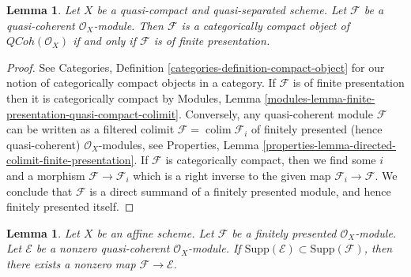 \documentclass{stacks-project}
\theoremstyle{plain}
\newtheorem{lemma}[subsection]{Lemma}
\theoremstyle{definition}
\theoremstyle{remark}
\numberwithin{equation}{subsection}
\def\colim{\mathop{\mathrm{colim}}\nolimits}
\def\QCoh{\mathit{QCoh}}
\begin{document}
\begin{lemma}
\label{lemma-categorically-compact-QCoh}
Let $X$ be a quasi-compact and quasi-separated scheme.
Let $\mathcal{F}$ be a quasi-coherent $\mathcal{O}_X$-module.
Then $\mathcal{F}$ is a categorically compact object of
$\QCoh(\mathcal{O}_X)$ if and only if $\mathcal{F}$ is of
finite presentation.
\end{lemma}

\begin{proof}
See Categories, Definition \ref{categories-definition-compact-object}
for our notion of categorically compact objects in a category.
If $\mathcal{F}$ is of finite presentation then it is categorically compact by
Modules, Lemma \ref{modules-lemma-finite-presentation-quasi-compact-colimit}.
Conversely, any quasi-coherent module $\mathcal{F}$ can be written
as a filtered colimit $\mathcal{F} = \colim \mathcal{F}_i$ of
finitely presented (hence quasi-coherent)
$\mathcal{O}_X$-modules, see Properties, Lemma
\ref{properties-lemma-directed-colimit-finite-presentation}.
If $\mathcal{F}$ is categorically compact, then we find
some $i$ and a morphism $\mathcal{F} \to \mathcal{F}_i$
which is a right inverse to the given map $\mathcal{F}_i \to \mathcal{F}$.
We conclude that $\mathcal{F}$ is a direct summand of a
finitely presented module, and hence finitely presented itself.
\end{proof}

\begin{lemma}
\label{lemma-supported-on-support-pre}
Let $X$ be an affine scheme. Let $\mathcal{F}$ be a finitely presented
$\mathcal{O}_X$-module. Let $\mathcal{E}$ be a nonzero quasi-coherent
$\mathcal{O}_X$-module. If
$\text{Supp}(\mathcal{E}) \subset \text{Supp}(\mathcal{F})$,
then there exists a nonzero map $\mathcal{F} \to \mathcal{E}$.
\end{lemma}
\end{document}
